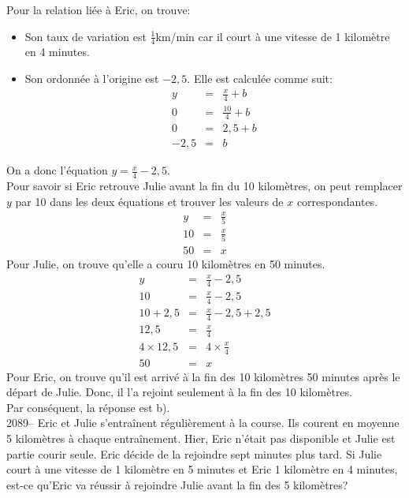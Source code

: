 \documentclass[letterpaper, 12pt]{article}
\begin{document}
Pour la relation li\'ee \`a Eric, on trouve:
\begin{itemize}
\item Son taux de variation est $\frac{1}{4}$km/min car il court \`a une vitesse de 1 kilom\`etre en 4 minutes.
\item Son ordonn\'ee \`a l'origine est $-2,5$. Elle est calcul\'ee comme suit:
\begin{eqnarray*}
y&=&\frac{x}{4}+b\\[2mm]
0&=&\frac{10}{4}+b\\[2mm]
0&=&2,5+b\\[2mm]
-2,5&=&b
\end{eqnarray*}
\end{itemize}
On a donc l'\'equation $y=\frac{x}{4}-2,5$.\\

Pour savoir si Eric retrouve Julie avant la fin du 10 kilom\`etres, on peut remplacer $y$ par 10 dans les deux \'equations et trouver les valeurs de $x$ correspondantes.
\begin{eqnarray*}
y&=&\frac{x}{5}\\[2mm]
10&=&\frac{x}{5}\\[2mm]
50&=&x
\end{eqnarray*}
Pour Julie, on trouve qu'elle a couru 10 kilom\`etres en 50 minutes.
\begin{eqnarray*}
y&=&\frac{x}{4}-2,5\\[2mm]
10&=&\frac{x}{4}-2,5\\[2mm]
10+2,5&=&\frac{x}{4}-2,5+2,5\\[2mm]
12,5&=&\frac{x}{4}\\[2mm]
4\times 12,5&=&4\times \frac{x}{4}\\[2mm]
50&=&x
\end{eqnarray*}
Pour Eric, on trouve qu'il est arriv\'e \`a la fin des 10 kilom\`etres 50 minutes apr\`es le d\'epart de Julie. Donc, il l'a rejoint seulement \`a la fin des 10 kilom\`etres.\\
Par cons\'equent, la r\'eponse est b).\\

2089-- Eric et Julie s'entra\^inent r\'eguli\`erement \`a la course. Ils courent en moyenne 5 kilom\`etres \`a chaque entra\^inement. Hier, Eric n'\'etait pas disponible et Julie est partie courir seule. Eric d\'ecide de la rejoindre sept minutes plus tard.  Si Julie court \`a une vitesse de 1 kilom\`etre en 5 minutes et Eric 1 kilom\`etre en 4 minutes, est-ce qu'Eric va r\'eussir \`a rejoindre Julie avant la fin des 5 kilom\`etres?\\
\end{document}
